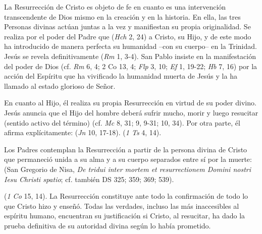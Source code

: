 \begin{ccebody}

 La Resurrección de Cristo es objeto de fe en cuanto es una intervención transcendente de Dios mismo en la creación y en la historia. En ella, las tres Personas divinas actúan juntas a la vez y manifiestan su propia originalidad. Se realiza por el poder del Padre que  (\textit{Hch} 2, 24) a Cristo, su Hijo, y de este modo ha introducido de manera perfecta su humanidad –con su cuerpo– en la Trinidad. Jesús se revela definitivamente  (\textit{Rm} 1, 3-4). San Pablo insiste en la manifestación del poder de Dios (cf. \textit{Rm} 6, 4; 2 Co 13, 4; \textit{Flp} 3, 10; \textit{Ef} 1, 19-22; \textit{Hb} 7, 16) por la acción del Espíritu que ha vivificado la humanidad muerta de Jesús y la ha llamado al estado glorioso de Señor.

 En cuanto al Hijo, él realiza su propia Resurrección en virtud de su poder divino. Jesús anuncia que el Hijo del hombre deberá sufrir mucho, morir y luego resucitar (sentido activo del término) (cf. \textit{Mc} 8, 31; 9, 9-31; 10, 34). Por otra parte, él afirma explícitamente:  (\textit{Jn} 10, 17-18).  (\textit{1 Ts} 4, 14).

 Los Padres contemplan la Resurrección a partir de la persona divina de Cristo que permaneció unida a su alma y a su cuerpo separados entre sí por la muerte:  (San Gregorio de Nisa, \textit{De tridui inter mortem et resurrectionem Domini nostri Iesu Christi spatio}; cf. también DS 325; 359; 369; 539).


  (\textit{1 Co} 15, 14). La Resurrección constituye ante todo la confirmación de todo lo que Cristo hizo y enseñó. Todas las verdades, incluso las más inaccesibles al espíritu humano, encuentran su justificación si Cristo, al resucitar, ha dado la prueba definitiva de su autoridad divina según lo había prometido.


\end{ccebody}
